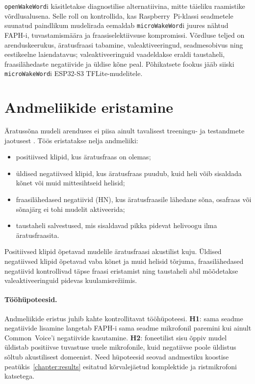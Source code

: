 \texttt{openWakeWord}i käsitletakse diagnostilise alternatiivina, mitte täieliku raamistike võrdlusalusena. Selle roll on kontrollida, kas Raspberry~Pi-klassi seadmetele suunatud paindlikum mudelirada eemaldab \texttt{microWakeWord}i juures nähtud FAPH-i, tuvastamismäära ja fraasiselektiivsuse kompromissi. Võrdluse teljed on arenduskeerukus, äratusfraasi tabamine, valeaktiveeringud, seadmesobivus ning eestikeelne laiendatavus; valeaktiveeringuid vaadeldakse eraldi taustaheli, fraasilähedaste negatiivide ja üldise kõne peal. Põhikatsete fookus jääb siiski \texttt{microWakeWord}i ESP32-S3 TFLite-mudelitele.

\section{Andmeliikide eristamine}
Äratussõna mudeli arenduses ei piisa ainult tavalisest treeningu- ja testandmete jaotusest \cite{lopezespejo2021deepkws,microwakeword2026}. Töös eristatakse nelja andmeliiki:
\begin{itemize}
    \item positiivsed klipid, kus äratusfraas on olemas;
    \item üldised negatiivsed klipid, kus äratusfraas puudub, kuid heli võib sisaldada kõnet või muid mittesihtseid helisid;
    \item fraasilähedased negatiivid (HN), kus äratusfraasile lähedane sõna, osafraas või sõnajärg ei tohi mudelit aktiveerida;
    \item taustaheli salvestused, mis sisaldavad pikka pidevat helivoogu ilma äratusfraasita.
\end{itemize}

Positiivsed klipid õpetavad mudelile äratusfraasi akustilist kuju. Üldised negatiivsed klipid õpetavad vaba kõnet ja muid helisid tõrjuma, fraasilähedased negatiivid kontrollivad täpse fraasi eristamist ning taustaheli abil mõõdetakse valeaktiveeringuid pidevas kuulamisrežiimis.

\paragraph{Tööhüpoteesid.} Andmeliikide eristus juhib kahte kontrollitavat tööhüpoteesi. \textbf{H1}: sama seadme negatiivide lisamine langetab FAPH-i sama seadme mikrofonil paremini kui ainult Common~Voice'i negatiivide kasutamine. \textbf{H2}: foneetilist sisu õppiv mudel üldistab positiivse tuvastuse uuele mikrofonile, kuid negatiivse poole üldistus sõltub akustilisest domeenist. Need hüpoteesid seovad andmestiku koostise peatükis~\ref{chapter:results} esitatud kõrvalejäetud komplektide ja ristmikrofoni katsetega.


